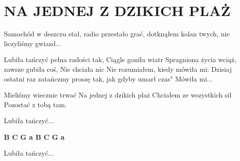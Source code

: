 \documentclass[../../../songbook.tex]{subfiles}
\begin{document}
\TabPositions{9cm} %
\section*{NA JEDNEJ Z DZIKICH PLAŻ}
{}
\vspace{0.5cm}
Samochód w deszczu stał,	 \newline
radio przestało grać,		\newline
dotknąłem kolan twych,		\newline
nie liczyliśmy gwiazd...	\newline

\-\hspace{1cm} Lubiła tańczyć pełna radości tak,			 \newline
\-\hspace{1cm} Ciągle goniła wiatr							 \newline
\-\hspace{1cm} Spragniona życia wciąż, zawsze gubiła coś,	 \newline
\-\hspace{1cm} Nie chciała nic								 \newline	
\-\hspace{1cm} Nie rozumiałem, kiedy mówiła mi:				 \newline
\-\hspace{1cm} Dzisiaj ostatni raz							 \newline
\-\hspace{1cm} zatańczmy proszę tak, jak gdyby umarł czas"	 \newline
\-\hspace{1cm} Mówiła mi...									 \newline

Mieliśmy wiecznie trwać		\newline
Na jednej z dzikich plaż		\newline
Chciałem ze wszystkich sił	\newline
Pozostać z tobą tam.	\newline

\-\hspace{1cm} Lubiła tańczyć...	\newline

{\color{red}\textbf{B C G a B C G a	} } \newline

\-\hspace{1cm} Lubiła tańczyć...	\newline
\end{document}
